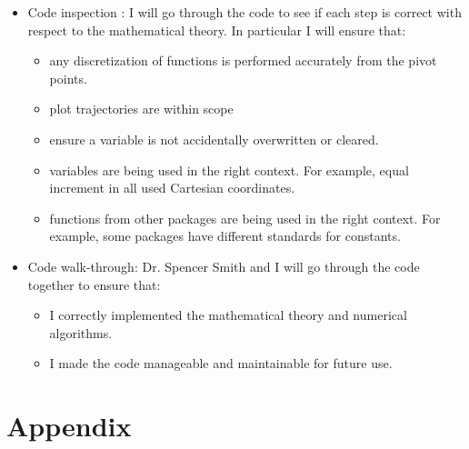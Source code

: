 \documentclass[12pt, titlepage]{article}
\begin{document}
\begin{itemize}
	\item Code inspection : I will 
	go through the code to see if each step is correct with respect to the
	mathematical theory. In particular I will ensure that: 
	\begin{itemize}
	\item any discretization of functions is performed accurately from the 
	pivot points. 
	\item plot trajectories are within scope
	\item ensure a variable is not accidentally 
	overwritten or cleared. 
	\item variables are being used in the right context. 
	For example, equal increment in all used Cartesian coordinates. 
	\item functions from other packages are being used in the right 
	context. For example, some packages have different standards for 
	constants.
	\end{itemize} 
	\item Code walk-through: Dr. Spencer Smith and I will go 
	through the code together to ensure that: 
	\begin{itemize}
	\item I correctly implemented the mathematical theory and numerical 
	algorithms.
	\item I made the code manageable and maintainable for future use.
	\end{itemize}
\end{itemize}


				




\newpage

\section{Appendix}
\end{document}
